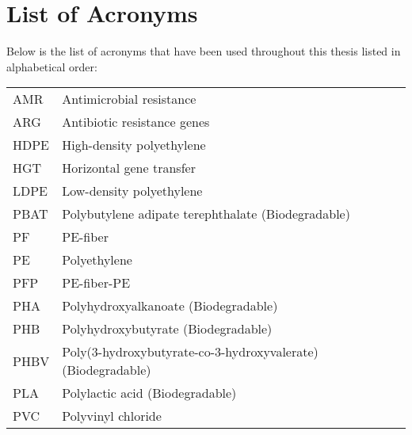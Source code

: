 \thispagestyle{plain}			%
\chapter*{List of Acronyms}
Below is the list of acronyms that have been used throughout this thesis listed in alphabetical order:
\vspace*{1.0cm}

\begin{tabular}{p{3cm}p{12cm}}
AMR & Antimicrobial resistance \\
ARG & Antibiotic resistance genes \\
HDPE & High-density polyethylene \\
HGT & Horizontal gene transfer \\
LDPE & Low-density polyethylene \\
PBAT & Polybutylene adipate terephthalate (Biodegradable) \\
PF & PE-fiber \\
PE & Polyethylene \\
PFP & PE-fiber-PE \\
PHA & Polyhydroxyalkanoate (Biodegradable) \\
PHB & Polyhydroxybutyrate (Biodegradable) \\
PHBV & Poly(3-hydroxybutyrate-co-3-hydroxyvalerate) (Biodegradable) \\
PLA & Polylactic acid (Biodegradable) \\
PVC & Polyvinyl chloride
\end{tabular}





\newpage				%
\thispagestyle{empty}
\mbox{}

